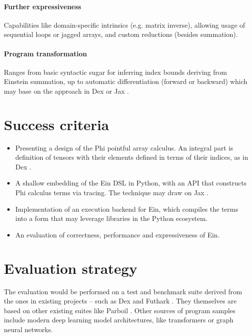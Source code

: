 \paragraph{Further expressiveness} Capabilities like domain-specific intrinsics (e.g. matrix inverse), allowing usage of sequential loops or jagged arrays, and custom reductions (besides summation).

\paragraph{Program transformation} Ranges from basic syntactic sugar for inferring index bounds deriving from Einstein summation, up to automatic differentiation (forward or backward) which may base on the approach in Dex \cite{Paszke2021GettingTT} or Jax \cite{jax2018}. 

\section{Success criteria}

\begin{itemize}
    \item Presenting a design of the Phi pointful array calculus. An integral part is definition of tensors with their elements defined in terms of their indices, as in Dex \cite{Paszke2021GettingTT}.
    \item A shallow embedding of the Ein DSL in Python, with an API that constructs Phi calculus terms via tracing. The technique may draw on Jax \cite{jax2018}.
    \item Implementation of an execution backend for Ein, which compiles the terms into a form that may leverage libraries in the Python ecosystem.
    \item An evaluation of correctness, performance and expressiveness of Ein.
\end{itemize}

\section{Evaluation strategy}


The evaluation would be performed on a test and benchmark suite derived from the ones in existing projects -- such as Dex \cite{Paszke2021GettingTT} and Futhark \cite{Henriksen:2017:FPF:3062341.3062354}. They themselves are based on other existing suites like Parboil \cite{Stratton2012ParboilAR}. Other sources of program samples include modern deep learning model architectures, like transformers or graph neural networks.
